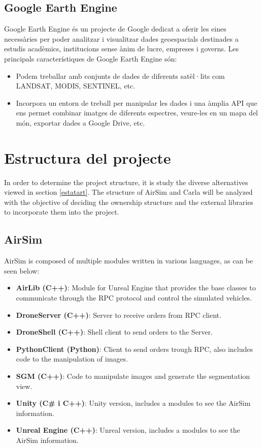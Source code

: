 \documentclass[10pt,a4paper,twocolumn,twoside]{article}
\begin{document}
\subsection{Google Earth Engine}

Google Earth Engine és un projecte de Google dedicat a oferir les eines necessàries per poder analitzar i visualitzar dades geoespacials destinades a estudis acadèmics, institucions sense ànim de lucre, empreses i governs. Les principals característiques de Google Earth Engine són:

\begin{itemize}
\setlength\itemsep{0em}
  \item Podem treballar amb conjunts de dades de diferents satèl·lits com LANDSAT, MODIS, SENTINEL, etc.
  \item Incorpora un entorn de treball per manipular les dades i una àmplia API que ens permet combinar imatges de diferents espectres, veure-les en un mapa del món, exportar dades a Google Drive, etc.
\end{itemize}

\section{Estructura del projecte}
In order to determine the project structure, it is study the diverse alternatives viewed in section \ref{estatart}. The structure of AirSim and Carla will be analyzed with the objective of deciding the ownership structure and the external libraries to incorporate them into the project.

\subsection{AirSim} 
AirSim is composed of multiple modules written in various languages, as can be seen below:

\begin{itemize}
\setlength\itemsep{0em}
	\item \textbf{AirLib (C++)}: Module for Unreal Engine that provides the base classes to communicate through the RPC protocol and control the simulated vehicles.
	\item \textbf{DroneServer (C++)}: Server to receive orders from RPC client.
  	\item \textbf{DroneShell (C++)}: Shell client to send orders to the Server.
  	\item \textbf{PythonClient (Python)}: Client to send orders trough RPC, also includes code to the manipulation of images.
  	\item \textbf{SGM (C++)}: Code to manipulate images and generate the segmentation view.
    \item \textbf{Unity (C\# i C++)}: Unity version, includes a modules to see the AirSim information.
    \item \textbf{Unreal Engine (C++)}: Unreal version, includes a modules to see the AirSim information.
\end{itemize}
\end{document}
